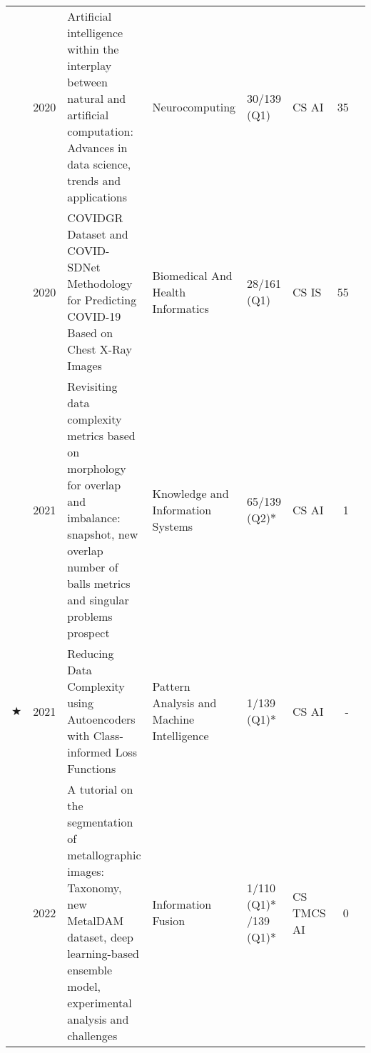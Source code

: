 \begin{table*}[htbp]
\begin{tabular}{crp{5.5cm}p{3cm}p{1.6cm}p{0.9cm}rc}
        & 2020 
        &   Artificial intelligence within the interplay between natural and artificial computation: Advances in data science, trends and applications 
        & Neurocomputing
        & 30/139 (Q1) & CS AI & 35 & \cite{interplay} \\

        & 2020 
        &    COVIDGR Dataset and COVID-SDNet Methodology for Predicting COVID-19 Based on Chest X-Ray Images 
        & Biomedical And Health Informatics
        & 28/161 (Q1) & CS IS & 55 & \cite{covid} \\

        & 2021 
        & Revisiting data complexity metrics based on morphology for overlap and imbalance: snapshot, new overlap number of balls metrics and singular problems prospect 
        & Knowledge and Information Systems
        & 65/139 (Q2)$\ast$ & CS AI & 1 & \cite{complexity} \\

        $\bigstar$ & 2021 
        &  Reducing Data Complexity using Autoencoders with Class-informed Loss Functions 
        & Pattern Analysis and Machine Intelligence
        & 1/139 (Q1)$\ast$ & CS AI & - & \cite{charte2021reducing} \\

        & 2022 
        &  A tutorial on the segmentation of metallographic images: Taxonomy, new MetalDAM dataset, deep learning-based ensemble model, experimental analysis and challenges 
        & Information Fusion
        & {1/110 (Q1)$\ast$\newline 3/139 (Q1)$\ast$} 
        & {CS TM\newline CS AI} & 0 & \cite{metallography} \\
        \bottomrule
    \end{tabular}
    \caption{\label{tbl:journals}Quality metrics of the articles published in JCR journals during the research period of the candidate. The position of each journal is taken from the JCR of the corresponding year, except for those marked with an asterisk ($\ast$) which are taken from JCR 2020. The source for the number of citations is Web of Science. Category legends: Statistics and Probability (STAT), Computer Science/Artificial Intelligence (CS AI), Computer Science/Theory and Methods (CS TM), Computer Science/Information Systems (CS IS). Articles marked with a star ($\bigstar$) are part of the core of this thesis.}
\end{table*}


